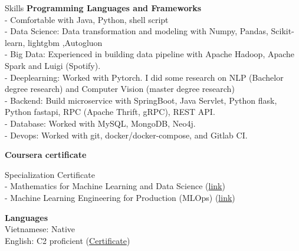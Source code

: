 \documentclass{resume} %
\begin{document}
\begin{rSection}{Skills}
{\bf Programming Languages and Frameworks }
\\ - Comfortable with Java, Python, shell script
\\ - Data Science: Data transformation and modeling with Numpy, Pandas, Scikit-learn, lightgbm ,Autogluon
\\ - Big Data: Experienced in building data pipeline with Apache Hadoop, Apache Spark and Luigi (Spotify).
\\ - Deeplearning: Worked with Pytorch. I did some research on NLP (Bachelor degree research) and Computer Vision (master degree research)
\\ - Backend: Build microservice with SpringBoot, Java Servlet, Python flask, Python fastapi, RPC (Apache Thrift, gRPC), REST API. 
\\ - Database: Worked with MySQL, MongoDB, Neo4j. 
\\ - Devops: Worked with git, docker/docker-compose, and Gitlab CI. 


{\bf Coursera certificate }

Specialization Certificate 
\\ - Mathematics for Machine Learning and Data Science (\href{https://coursera.org/share/ae3f40effbceedf3488075d566a95551}{link})
\\ - Machine Learning Engineering for Production (MLOps) (\href{https://coursera.org/share/ce5ec378a0075b8ffdbd5b235f8a84bd}{link})


{\bf Languages}
\\Vietnamese: Native
\\English: C2 proficient (\href{https://www.efset.org/cert/o5HAWP}{Certificate})
\end{rSection}




\end{document}
